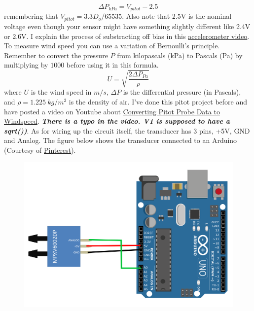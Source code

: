 \begin{equation}
\Delta P_{kPa} = V_{pitot} - 2.5
\end{equation}
remembering that $V_{pitot}=3.3D_o/65535$. Also note that 2.5V is the nominal voltage even though your sensor might have something slightly different like 2.4V or 2.6V.  I explain the process of substracting off bias in this \href{https://www.youtube.com/watch?v=e4xs9Ky7_YI&feature=youtu.be}{accelerometer video}. To measure wind speed you can use a variation of Bernoulli's principle. Remember to convert the pressure $P$ from kilopascals (kPa) to Pascals (Pa) by multiplying by $1000$ before using it in this formula.
\begin{equation*}
    U = \sqrt{\frac{2 \Delta P_{Pa}}{\rho}}
\end{equation*}
where $U$ is the wind speed in $m/s$, $\Delta P$ is the differential pressure (in Pascals), and $\rho=1.225~kg/m^3$ is the density of air. I've done this pitot project before and have posted a video on Youtube about \href{https://youtu.be/jSLIRC1cfvE}{Converting Pitot Probe Data to Windspeed}. {\bf \it There is a typo in the video. V1 is supposed to have a sqrt())}. As for wiring up the circuit itself, the transducer has 3 pins, +5V, GND and Analog. The figure below shows the transducer connected to an Arduino (Courtesy of \href{https://www.pinterest.com/pin/create/button/?guid=jWEbJ2QP0Vh9&url=https%3A%2F%2Fmakersportal.com%2Fblog%2F2019%2F02%2F06%2Farduino-pitot-tube-wind-speed-theory-and-experiment&media=https%3A%2F%2Fimages.squarespace-cdn.com%2Fcontent%2Fv1%2F59b037304c0dbfb092fbe894%2F1549565434223-TTB9OMIQ3FMP2JLZ0RX2%2FArduino%2BMPXV7002DP%2BWiring%2Bfor%2BDifferential%2BPressure%2BMeasurement&description=Arduino%20MPXV7002DP%20Wiring%20for%20Differential%20Pressure%20Measurement}{Pinterest}).
\begin{figure}[H]
  \begin{center}
    \includegraphics[width=\textwidth]{Figures/Arduino+MPXV7002DP+Wiring+for+Differential+Pressure+Measurement.png}
  \end{center}
\end{figure}
